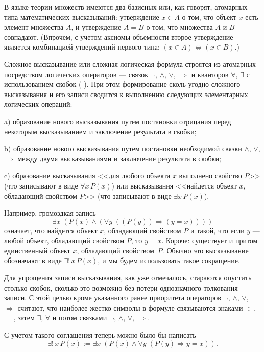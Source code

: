 В языке теории множеств имеются два базисных или, как говорят, атомарных типа математических высказываний:
утверждение $x \in A$ о том, что объект $x$ есть элемент множества $A$, и утверждение $A = B$ о том, что множества $A$ и $B$ совпадают. (Впрочем, с учетом
аксиомы объемности второе утверждение является комбинацией утверждений первого типа: $(x \in A) \Leftrightarrow (x \in B)$.)

Сложное высказывание или сложная логическая формула строятся из
атомарных посредством логических операторов --- связок $\neg$, $\land$, $\lor$, $\Rightarrow$ и
кванторов $\forall$, $\exists$ с использованием скобок ( ). При этом формирование сколь
угодно сложного высказывания и его записи сводится к выполнению
следующих элементарных логических операций:

a) образование нового высказывания путем постановки отрицания перед
некоторым высказыванием и заключение результата в скобки;

b) образование нового высказывания путем постановки необходимой
связки $\land$, $\lor$, $\Rightarrow$ между двумя высказываниями и заключение результата в
скобки;

c) образование высказывания <<для любого объекта $x$ выполнено свойство $P$>> (что записывают в виде $\forall x\, P(x)$) или высказывания <<найдется объект $x$, обладающий свойством $P$>> (что записывают в виде $\exists x\, P(x)$).

\medskip

Например, громоздкая запись
\[
  \exists x\; (P(x) \land (\forall y\; ((P(y)) \Rightarrow (y = x))))
\]
означает, что найдется объект $x$, обладающий свойством $P$ и такой, что если
$y$ --- любой объект, обладающий свойством $P$, то $y = x$. Короче: существует
и притом единственный объект $x$, обладающий свойством~$P$. Обычно это
высказывание обозначают в виде $\exists!\, x\, P(x)$, и мы будем использовать такое
сокращение.

Для упрощения записи высказывания, как уже отмечалось, стараются
опустить столько скобок, сколько это возможно без потери однозначного
толкования записи. С этой целью кроме указанного ранее приоритета
операторов $\neg$, $\land$, $\lor$, $\Rightarrow$ считают, что наиболее жестко символы в формуле
связываются знаками $\in$, $=$, затем $\exists$, $\forall$ и потом связками $\neg$, $\land$, $\lor$, $\Rightarrow$.

С учетом такого соглашения теперь можно было бы написать
\[
  \exists!\, x\, P(x) := \exists x\; (P(x) \land \forall y\; (P(y) \Rightarrow y = x)).
\]

